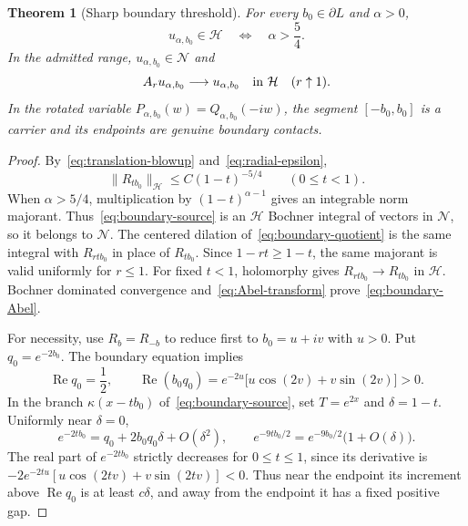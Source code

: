 \documentclass[11pt,a4paper]{article}
\numberwithin{equation}{section}
\newtheorem{theorem}{Theorem}[section]
\theoremstyle{definition}
\theoremstyle{remark}
\newcommand{\Hh}{\mathcal H}
\newcommand{\Nn}{\mathcal N}
\newcommand{\norm}[1]{\lVert #1\rVert}
\begin{document}
\begin{theorem}[Sharp boundary threshold]\label{thm:boundary-family}
For every $b_0\in\partial L$ and $\alpha>0$,
\begin{equation}\label{eq:boundary-threshold}
 u_{\alpha,b_0}\in\Hh\quad\Longleftrightarrow\quad\alpha>\frac54.
\end{equation}
In the admitted range, $u_{\alpha,b_0}\in\Nn$ and
\begin{equation}\label{eq:boundary-Abel}
 A_ru_{\alpha,b_0}\longrightarrow u_{\alpha,b_0}
 \quad\hbox{in }\Hh\quad(r\uparrow1).
\end{equation}
In the rotated variable $P_{\alpha,b_0}(w)=Q_{\alpha,b_0}(-iw)$, the segment $[-b_0,b_0]$ is a carrier and its endpoints are genuine boundary contacts.
\end{theorem}
\begin{proof}
By~\eqref{eq:translation-blowup} and~\eqref{eq:radial-epsilon},
\begin{equation}\label{eq:boundary-majorant}
 \norm{R_{tb_0}}_{\Hh}\le C(1-t)^{-5/4}\qquad(0\le t<1).
\end{equation}
When $\alpha>5/4$, multiplication by $(1-t)^{\alpha-1}$ gives an integrable norm majorant. Thus~\eqref{eq:boundary-source} is an $\Hh$ Bochner integral of vectors in $\Nn$, so it belongs to $\Nn$. The centered dilation of~\eqref{eq:boundary-quotient} is the same integral with $R_{rtb_0}$ in place of $R_{tb_0}$. Since $1-rt\ge1-t$, the same majorant is valid uniformly for $r\le1$. For fixed $t<1$, holomorphy gives $R_{rtb_0}\to R_{tb_0}$ in $\Hh$. Bochner dominated convergence and~\eqref{eq:Abel-transform} prove~\eqref{eq:boundary-Abel}.

For necessity, use $R_b=R_{-b}$ to reduce first to $b_0=u+iv$ with $u>0$. Put $q_0=e^{-2b_0}$. The boundary equation implies
\begin{equation}\label{eq:boundary-q}
 \operatorname{Re}q_0=\frac12,\qquad
 \operatorname{Re}(b_0q_0)
 =e^{-2u}\bigl[u\cos(2v)+v\sin(2v)\bigr]>0.
\end{equation}
In the branch $\kappa(x-tb_0)$ of~\eqref{eq:boundary-source}, set $T=e^{2x}$ and $\delta=1-t$. Uniformly near $\delta=0$,
\[
 e^{-2tb_0}=q_0+2b_0q_0\delta+O(\delta^2),\qquad
 e^{-9tb_0/2}=e^{-9b_0/2}\bigl(1+O(\delta)\bigr).
\]
The real part of $e^{-2tb_0}$ strictly decreases for $0\le t\le1$, since its derivative is
$-2e^{-2tu}[u\cos(2tv)+v\sin(2tv)]<0$.
Thus near the endpoint its increment above $\operatorname{Re}q_0$ is at least $c\delta$, and away from the endpoint it has a fixed positive gap.


\end{proof}
\end{document}
